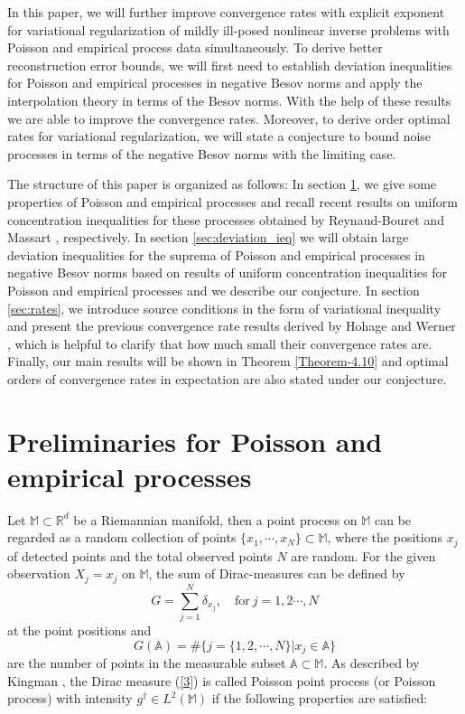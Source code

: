 \documentclass[10pt]{iopart}
\begin{document}
In this paper, we will further improve convergence rates with explicit exponent for variational regularization of mildly ill-posed nonlinear inverse 
problems with Poisson and empirical process data simultaneously. To derive better reconstruction error bounds, we will first need to establish deviation
inequalities for Poisson and empirical processes in negative Besov norms and apply the interpolation theory in terms of the Besov norms. With the 
help of these results we are able to improve the convergence rates. Moreover, to derive order optimal rates for variational regularization, we will 
state a conjecture to bound noise processes in terms of the negative Besov norms with the limiting case.   

The structure of this paper is organized as follows: In section \ref{sec:preliminaries}, we give some properties of Poisson and empirical 
processes and recall recent results on uniform concentration inequalities for these processes obtained by Reynaud-Bouret \cite{ReynaudBouret2003} 
and Massart \cite{Massart2000}, respectively. In section \ref{sec:deviation_ieq} we will obtain large deviation inequalities for the suprema of 
Poisson and empirical processes in negative Besov norms based on results of uniform concentration inequalities for Poisson and empirical
processes \cite{Massart2000, ReynaudBouret2003} and we describe our conjecture. In section \ref{sec:rates}, we introduce source conditions 
in the form of variational inequality and present the previous convergence rate results derived by Hohage and Werner \cite{Hohage2016}, which
is helpful to clarify that how much small their convergence rates are. Finally, our main results will be shown in Theorem \ref{Theorem-4.10}
and optimal orders of convergence rates in expectation are also stated under our conjecture.  

\section{Preliminaries for Poisson and empirical processes}\label{sec:preliminaries}
\hspace{0.5cm}
Let $\mathbb{M}\subset\mathbb{R}^{d}$ be a Riemannian manifold, then a point process on $\mathbb{M}$ can be regarded as a random collection
of points $\{x_{1}, \cdots, x_{N}\}\subset \mathbb{M}$, where the positions $x_{j}$ of detected points and the total observed points $N$ 
are random. For the given observation $X_{j}=x_{j}$ on $\mathbb{M}$, the sum of Dirac-measures can be defined by
\begin{equation}\label{3}
G=\sum_{j=1}^{N}\delta_{x_{j}}, \quad \mbox{for}~ j=1,2 \cdots, N
\end{equation}
at the point positions and
\begin{equation*}
G(\mathbb{A})=\#\{j=\{1, 2, \cdots, N\}| x_{j}\in\mathbb{A}\}
\end{equation*}
are the number of points in the measurable subset $\mathbb{A}\subset\mathbb{M}$. 
As described by Kingman \cite{kingman1993}, the Dirac measure (\ref{3}) is called Poisson point process (or Poisson process)
with intensity $g^{\dagger}\in L^{2}(\mathbb{M})$ if the following properties are satisfied:
\end{document}
